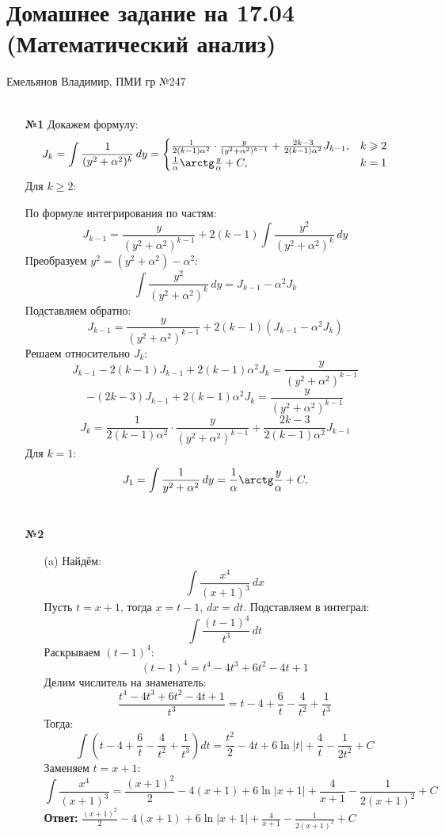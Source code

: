 \documentclass[a4paper]{article}
\renewcommand{\f}[2]{\frac{#1}{#2}}
\newcommand{\case}[1]{\begin{cases} #1 \end{cases}}
\renewcommand{\geq}{\geqslant}
\begin{document}
\section*{Домашнее задание на 17.04 (Математический анализ)}
 {\large Емельянов Владимир, ПМИ гр №247}\\\\
\begin{enumerate}
    \item[\textbf{№1}]Докажем формулу:
    \[
    J_k = \int \frac{1}{(y^2 + \alpha^2)^k} \, dy = \case{
        \frac{1}{2(k-1)\alpha^2} \cdot \frac{y}{(y^2 + \alpha^2)^{k-1}} + \frac{2k - 3}{2(k-1)\alpha^2} J_{k-1}, & k\geq 2\\
        \f{1}{\alpha}\arctg \f{y}{\alpha} + C, & k=1
    }  
    \]  
    Для \( k \geq 2 \):

    По формуле интегрирования по частям:  
    \[
    J_{k-1} = \frac{y}{(y^2 + \alpha^2)^{k-1}} + 2(k-1) \int \frac{y^2}{(y^2 + \alpha^2)^k} \, dy
    \]  
    Преобразуем \( y^2 = (y^2 + \alpha^2) - \alpha^2 \):  
    \[
    \int \frac{y^2}{(y^2 + \alpha^2)^k} \, dy = J_{k-1} - \alpha^2 J_k
    \]  
    Подставляем обратно:  
    \[
    J_{k-1} = \frac{y}{(y^2 + \alpha^2)^{k-1}} + 2(k-1)(J_{k-1} - \alpha^2 J_k)
    \]  
    Решаем относительно \( J_k \):  
    \[
    J_{k-1} - 2(k-1)J_{k-1} + 2(k-1)\alpha^2 J_k = \frac{y}{(y^2 + \alpha^2)^{k-1}} 
    \]  
    \[
    - (2k - 3) J_{k-1} + 2(k-1)\alpha^2 J_k = \frac{y}{(y^2 + \alpha^2)^{k-1}}  
    \]  
    \[
    J_k = \frac{1}{2(k-1)\alpha^2} \cdot \frac{y}{(y^2 + \alpha^2)^{k-1}} + \frac{2k - 3}{2(k-1)\alpha^2} J_{k-1}
    \]  
    Для \( k = 1 \):  
    \[
    J_1 = \int \frac{1}{y^2 + \alpha^2} \, dy = \frac{1}{\alpha} \arctg \frac{y}{\alpha} + C.
    \]  \\

    \item[\textbf{№2}]\begin{enumerate}
    \item[(a)]Найдём:
    $$\int \frac{x^4}{(x+1)^3} \, dx$$
    Пусть \( t = x + 1 \), тогда \( x = t - 1 \), \( dx = dt \). Подставляем в интеграл:
    \[
    \int \frac{(t - 1)^4}{t^3} \, dt
    \]
    Раскрываем \((t - 1)^4\):
    \[
    (t - 1)^4 = t^4 - 4t^3 + 6t^2 - 4t + 1
    \]
    Делим числитель на знаменатель:
    \[
    \frac{t^4 - 4t^3 + 6t^2 - 4t + 1}{t^3} = t - 4 + \frac{6}{t} - \frac{4}{t^2} + \frac{1}{t^3}
    \]
    Тогда:
    \[
    \int \left( t - 4 + \frac{6}{t} - \frac{4}{t^2} + \frac{1}{t^3} \right) dt = \frac{t^2}{2} - 4t + 6\ln|t| + \frac{4}{t} - \frac{1}{2t^2} + C
    \]
    Заменяем \( t = x + 1 \):
    \[
    \int \frac{x^4}{(x+1)^3} = \frac{(x + 1)^2}{2} - 4(x + 1) + 6\ln|x + 1| + \frac{4}{x + 1} - \frac{1}{2(x + 1)^2} + C
    \]
    \textbf{Ответ:} $\frac{(x + 1)^2}{2} - 4(x + 1) + 6\ln|x + 1| + \frac{4}{x + 1} - \frac{1}{2(x + 1)^2} + C$\\


\end{enumerate}
\end{enumerate}
\end{document}
